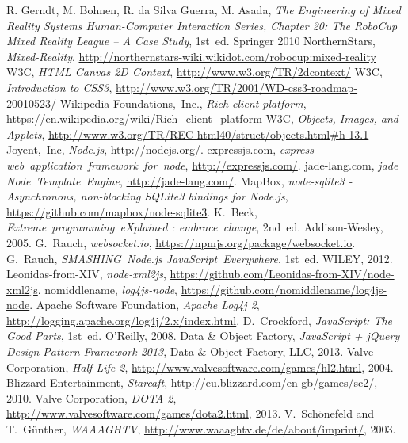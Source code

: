 \documentclass[journal]{IEEEtran}
\begin{document}
\begin{thebibliography}{1}

R. Gerndt, M. Bohnen, R. da Silva Guerra, M. Asada, \emph{The Engineering of
Mixed Reality Systems Human-Computer Interaction Series, Chapter 20: The RoboCup
Mixed Reality League – A Case Study}, 1st~ed. Springer 2010
NorthernStars, \emph{Mixed-Reality},
\url{http://northernstars-wiki.wikidot.com/robocup:mixed-reality}
W3C, \emph{HTML Canvas 2D Context}, \url{http://www.w3.org/TR/2dcontext/}
W3C, \emph{Introduction to CSS3},
\url{http://www.w3.org/TR/2001/WD-css3-roadmap-20010523/}
Wikipedia Foundations,~Inc., \emph{Rich client platform},
\url{https://en.wikipedia.org/wiki/Rich_client_platform}
W3C, \emph{Objects, Images, and Applets},
\url{http://www.w3.org/TR/REC-html40/struct/objects.html#h-13.1}
Joyent,~Inc, \emph{Node.js}, \url{http://nodejs.org/}.
expressjs.com, \emph{express web~application~framework~for~node}, \url{http://expressjs.com/}.
jade-lang.com, \emph{jade Node~Template~Engine}, \url{http://jade-lang.com/}.
MapBox, \emph{node-sqlite3 - Asynchronous, non-blocking SQLite3 bindings for Node.js}, \url{https://github.com/mapbox/node-sqlite3}.
K.~Beck, \emph{Extreme~programming~eXplained : embrace~change}, 2nd~ed. Addison-Wesley, 2005.
G.~Rauch, \emph{websocket.io}, \url{https://npmjs.org/package/websocket.io}.
G.~Rauch, \emph{SMASHING~Node.js JavaScript~Everywhere}, 1st~ed. WILEY, 2012.
Leonidas-from-XIV, \emph{node-xml2js}, \url{https://github.com/Leonidas-from-XIV/node-xml2js}.
nomiddlename, \emph{log4js-node}, \url{https://github.com/nomiddlename/log4js-node}.
Apache Software Foundation, \emph{Apache Log4j 2}, \url{http://logging.apache.org/log4j/2.x/index.html}.
D.~Crockford, \emph{JavaScript: The Good Parts}, 1st~ed. O'Reilly, 2008.
Data \& Object Factory, \emph{JavaScript + jQuery Design Pattern Framework 2013}, Data \& Object Factory, LLC, 2013.
Valve Corporation, \emph{Half-Life 2}, \url{http://www.valvesoftware.com/games/hl2.html}, 2004.
Blizzard Entertainment, \emph{Starcaft}, \url{http://eu.blizzard.com/en-gb/games/sc2/}, 2010.
Valve Corporation, \emph{DOTA 2}, \url{http://www.valvesoftware.com/games/dota2.html}, 2013.
V.~Schönefeld and T.~Günther, \emph{WAAAGHTV}, \url{http://www.waaaghtv.de/de/about/imprint/}, 2003.

\end{thebibliography}
\end{document}
